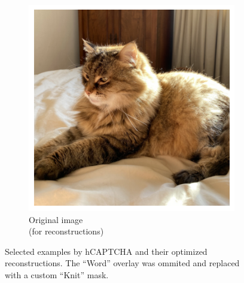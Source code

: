 \documentclass[a4paper, oneside]{discothesis}
\begin{document}
\begin{figure}[th]
	\hfill
	\begin{subfigure}[t]{0.19\textwidth}\centering\includegraphics[width=\linewidth]{figures/hcaptcha-copy-original.png}\caption{Original image\\(for reconstructions)}\label{fig:subfig9}\end{subfigure}

	\caption{Selected examples by hCAPTCHA and their optimized reconstructions. The ``Word'' overlay was ommited and replaced with a custom ``Knit'' mask.}
	\label{fig:hcaptchacombined}
\end{figure}
\end{document}
